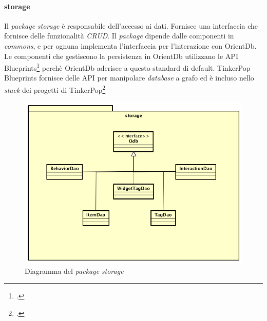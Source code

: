 \paragraph*{storage}
Il \emph{package} \emph{storage} è responsabile dell'accesso ai dati. Fornisce una interfaccia che fornisce delle funzionalità \emph{CRUD}. Il \emph{package} dipende dalle componenti in \emph{commons}, e per ognuna implementa l'interfaccia per l'interazione con OrientDb. Le componenti che gestiscono la persistenza in OrientDb utilizzano le API Blueprints\footcite{https://github.com/tinkerpop/blueprints} perchè OrientDb aderisce a questo standard di default. TinkerPop Blueprints fornisce delle API per manipolare \emph{database} a grafo ed è incluso nello \emph{stack} dei progetti di TinkerPop\footcite{http://tinkerpop.incubator.apache.org/}
\begin{figure}[h]
\centering
\includegraphics[scale=0.28]{immagini/storage}
\caption{Diagramma del \emph{package} \emph{storage}}
\label{fig:pack-storage}
\end{figure}
\newpage
